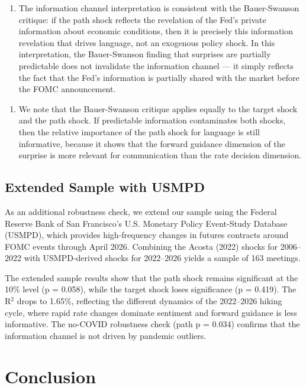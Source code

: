 \begin{enumerate}
\item The information channel interpretation is consistent with the Bauer-Swanson critique: if the path shock reflects the revelation of the Fed's private information about economic conditions, then it is precisely this information revelation that drives language, not an exogenous policy shock. In this interpretation, the Bauer-Swanson finding that surprises are partially predictable does not invalidate the information channel --- it simply reflects the fact that the Fed's information is partially shared with the market before the FOMC announcement.
\end{enumerate}

\begin{enumerate}
\item We note that the Bauer-Swanson critique applies equally to the target shock and the path shock. If predictable information contaminates both shocks, then the relative importance of the path shock for language is still informative, because it shows that the forward guidance dimension of the surprise is more relevant for communication than the rate decision dimension.
\end{enumerate}

\subsection{Extended Sample with USMPD}

As an additional robustness check, we extend our sample using the Federal Reserve Bank of San Francisco's U.S. Monetary Policy Event-Study Database (USMPD), which provides high-frequency changes in futures contracts around FOMC events through April 2026. Combining the Acosta (2022) shocks for 2006--2022 with USMPD-derived shocks for 2022--2026 yields a sample of 163 meetings.

The extended sample results show that the path shock remains significant at the 10\% level (p = 0.058), while the target shock loses significance (p = 0.419). The R$^2$ drops to 1.65\%, reflecting the different dynamics of the 2022--2026 hiking cycle, where rapid rate changes dominate sentiment and forward guidance is less informative. The no-COVID robustness check (path p = 0.034) confirms that the information channel is not driven by pandemic outliers.


\section{Conclusion}

